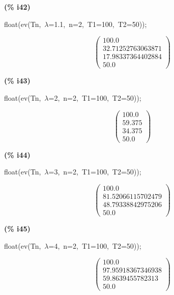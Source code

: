 \documentclass[fleqn]{article}
\begin{document}
\noindent
\begin{minipage}[t]{4.000000em}\color{red}\bfseries
(\% i42)	
\end{minipage}
\begin{minipage}[t]{\textwidth}\color{blue}
float(ev(Tn,\ \ensuremath{\lambda}=1.1,\ n=2,\ T1=100,\ T2=50));
\end{minipage}
\[\displaystyle \tag{\% o42} 
\begin{pmatrix}100.0\\
32.71252763063871\\
17.98337364402884\\
50.0\end{pmatrix}\mbox{}
\]


\noindent
\begin{minipage}[t]{4.000000em}\color{red}\bfseries
(\% i43)	
\end{minipage}
\begin{minipage}[t]{\textwidth}\color{blue}
float(ev(Tn,\ \ensuremath{\lambda}=2,\ n=2,\ T1=100,\ T2=50));
\end{minipage}
\[\displaystyle \tag{\% o43} 
\begin{pmatrix}100.0\\
59.375\\
34.375\\
50.0\end{pmatrix}\mbox{}
\]


\noindent
\begin{minipage}[t]{4.000000em}\color{red}\bfseries
(\% i44)	
\end{minipage}
\begin{minipage}[t]{\textwidth}\color{blue}
float(ev(Tn,\ \ensuremath{\lambda}=3,\ n=2,\ T1=100,\ T2=50));
\end{minipage}
\[\displaystyle \tag{\% o44} 
\begin{pmatrix}100.0\\
81.52066115702479\\
48.79338842975206\\
50.0\end{pmatrix}\mbox{}
\]


\noindent
\begin{minipage}[t]{4.000000em}\color{red}\bfseries
(\% i45)	
\end{minipage}
\begin{minipage}[t]{\textwidth}\color{blue}
float(ev(Tn,\ \ensuremath{\lambda}=4,\ n=2,\ T1=100,\ T2=50));
\end{minipage}
\[\displaystyle \tag{\% o45} 
\begin{pmatrix}100.0\\
97.95918367346938\\
59.8639455782313\\
50.0\end{pmatrix}\mbox{}
\]
\end{document}
